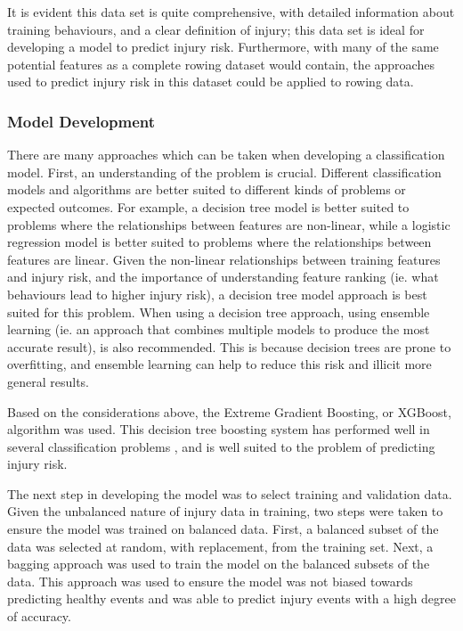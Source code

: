 It is evident this data set is quite comprehensive, with detailed information about training behaviours, and a clear definition of injury; this data set is ideal for developing a model to predict injury risk. Furthermore, with many of the same potential features as a complete rowing dataset would contain, the approaches used to predict injury risk in this dataset could be applied to rowing data.

\subsubsection{Model Development}
There are many approaches which can be taken when developing a classification model. First, an understanding of the problem is crucial. Different classification models and algorithms are better suited to different kinds of problems or expected outcomes. For example, a decision tree model is better suited to problems where the relationships between features are non-linear, while a logistic regression model is better suited to problems where the relationships between features are linear. Given the non-linear relationships between training features and injury risk, and the importance of understanding feature ranking (ie. what behaviours lead to higher injury risk), a decision tree model approach is best suited for this problem. When using a decision tree approach, using ensemble learning (ie. an approach that combines multiple models to produce the most accurate result), is also recommended. This is because decision trees are prone to overfitting, and ensemble learning can help to reduce this risk and illicit more general results.

Based on the considerations above, the Extreme Gradient Boosting, or XGBoost, algorithm was used. This decision tree boosting system has performed well in several classification problems \cite{Lovdal2021}, and is well suited to the problem of predicting injury risk. 

The next step in developing the model was to select training and validation data. Given the unbalanced nature of injury data in training, two steps were taken to ensure the model was trained on balanced data. First, a balanced subset of the data was selected at random, with replacement, from the training set. Next, a bagging approach was used to train the model on the balanced subsets of the data. This approach was used to ensure the model was not biased towards predicting healthy events and was able to predict injury events with a high degree of accuracy. 


